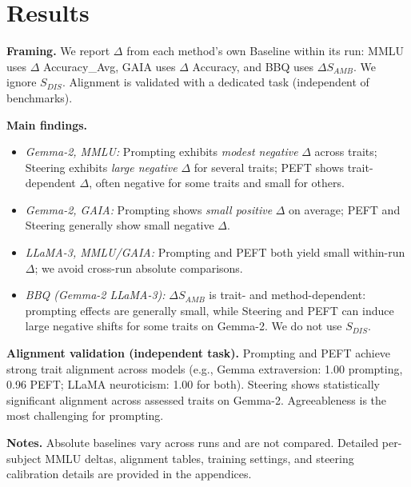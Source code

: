 \section{Results}

\textbf{Framing.} We report \(\Delta\) from each method's own Baseline within its run: MMLU uses \(\Delta\) Accuracy\_Avg, GAIA uses \(\Delta\) Accuracy, and BBQ uses \(\Delta S_{AMB}\). We ignore \(S_{DIS}\). Alignment is validated with a dedicated task (independent of benchmarks).

\textbf{Main findings.}
\begin{itemize}
\item \emph{Gemma-2, MMLU:} Prompting exhibits \emph{modest negative} \(\Delta\) across traits; Steering exhibits \emph{large negative} \(\Delta\) for several traits; PEFT shows trait-dependent \(\Delta\), often negative for some traits and small for others.
\item \emph{Gemma-2, GAIA:} Prompting shows \emph{small positive} \(\Delta\) on average; PEFT and Steering generally show small negative \(\Delta\).
\item \emph{LLaMA-3, MMLU/GAIA:} Prompting and PEFT both yield small within-run \(\Delta\); we avoid cross-run absolute comparisons.
\item \emph{BBQ (Gemma-2 \/ LLaMA-3):} \(\Delta S_{AMB}\) is trait- and method-dependent: prompting effects are generally small, while Steering and PEFT can induce large negative shifts for some traits on Gemma-2. We do not use \(S_{DIS}\).
\end{itemize}

\textbf{Alignment validation (independent task).} Prompting and PEFT achieve strong trait alignment across models (e.g., Gemma extraversion: 1.00 prompting, 0.96 PEFT; LLaMA neuroticism: 1.00 for both). Steering shows statistically significant alignment across assessed traits on Gemma-2. Agreeableness is the most challenging for prompting.


\textbf{Notes.} Absolute baselines vary across runs and are not compared. Detailed per-subject MMLU deltas, alignment tables, training settings, and steering calibration details are provided in the appendices.